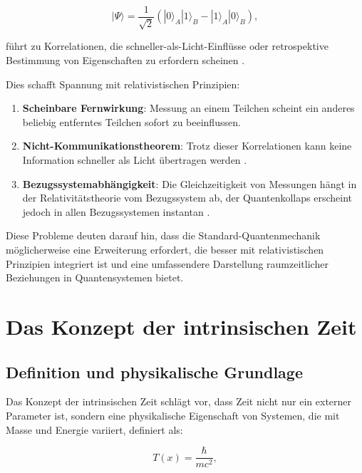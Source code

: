 \documentclass[12pt,a4paper]{article}
\newcommand{\Tfield}{T(x)}
\begin{document}
	\begin{equation}
		|\Psi\rangle = \frac{1}{\sqrt{2}}(|0\rangle_A |1\rangle_B - |1\rangle_A |0\rangle_B),
		\label{eq:entangled_state}
	\end{equation}
	
	führt zu Korrelationen, die schneller-als-Licht-Einflüsse oder retrospektive Bestimmung von Eigenschaften zu erfordern scheinen \cite{EPR1935}.
	
	Dies schafft Spannung mit relativistischen Prinzipien:
	
	\begin{enumerate}
		\item \textbf{Scheinbare Fernwirkung}: Messung an einem Teilchen scheint ein anderes beliebig entferntes Teilchen sofort zu beeinflussen.
		
		\item \textbf{Nicht-Kommunikationstheorem}: Trotz dieser Korrelationen kann keine Information schneller als Licht übertragen werden \cite{Eberhard1978, Ghirardi1980}.
		
		\item \textbf{Bezugssystemabhängigkeit}: Die Gleichzeitigkeit von Messungen hängt in der Relativitätstheorie vom Bezugssystem ab, der Quantenkollaps erscheint jedoch in allen Bezugssystemen instantan \cite{Aharonov1980, Aharonov1981}.
	\end{enumerate}
	
	Diese Probleme deuten darauf hin, dass die Standard-Quantenmechanik möglicherweise eine Erweiterung erfordert, die besser mit relativistischen Prinzipien integriert ist und eine umfassendere Darstellung raumzeitlicher Beziehungen in Quantensystemen bietet.
	
	\section{Das Konzept der intrinsischen Zeit}
	\label{sec:intrinsic_time}
	
	\subsection{Definition und physikalische Grundlage}
	\label{subsec:intrinsic_definition}
	
	Das Konzept der intrinsischen Zeit schlägt vor, dass Zeit nicht nur ein externer Parameter ist, sondern eine physikalische Eigenschaft von Systemen, die mit Masse und Energie variiert, definiert als:
	
	\begin{equation}
		\Tfield = \frac{\hbar}{mc^2},
		\label{eq:intrinsic_time}
	\end{equation}
	
\end{document}
